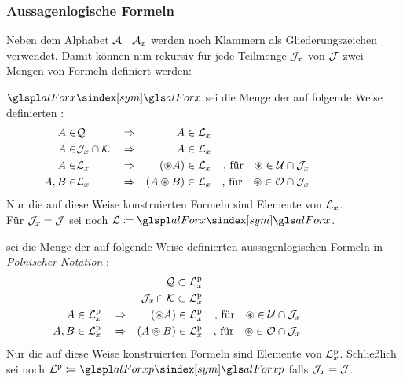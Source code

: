 \subsubsection{Aussagenlogische Formeln}%
\label{subsub:Formeln}

Neben dem Alphabet $\mathcal{A}$ \textbzw\ $\mathcal{A}_x$ werden noch Klammern als Gliederungszeichen verwendet.
Damit können nun rekursiv für jede Teilmenge $\mathcal{J}_x$ von $\mathcal{J}$ zwei Mengen von Formeln definiert werden:

$\glsSym{alForx}$ sei die Menge der auf folgende Weise definierten %
:
\begin{align}
	A    \in & \mathcal{Q}               && \Rightarrow &           A  \in \mathcal{L}_x
	\\
	A    \in & \mathcal{J}_x \cap \mathcal{K}  && \Rightarrow &           A  \in \mathcal{L}_x
	\\
	A    \in & \mathcal{L}_x              && \Rightarrow &   (\circledast A) \in \mathcal{L}_x
	& & \text{, für} \quad \circledast \in \mathcal{U} \cap \mathcal{J}_x
	\\
	A, B \in & \mathcal{L}_x              && \Rightarrow & (A \circledast B) \in \mathcal{L}_x
	& & \text{, für} \quad \circledast \in \mathcal{O} \cap \mathcal{J}_x
	&&&&&&&&&&
\end{align}
Nur die auf diese Weise konstruierten Formeln sind Elemente von $\mathcal{L}_x$.
\\Für $\mathcal{J}_x = \mathcal{J}$ sei noch $\alFor \defeq \glsSym{alForx}$.

 sei die Menge der auf folgende Weise definierten aussagenlogischen Formeln in \emph{Polnischer Notation}%
:
\begin{align}
	&                                  & \mathcal{Q}              \subset \mathcal{L}^\mathrm{p}_x
	\\
	&                                  & \mathcal{J}_x \cap \mathcal{K} \subset \mathcal{L}^\mathrm{p}_x
	\\
	A    \in \mathcal{L}^\mathrm{p}_x & \quad \Rightarrow &  (\circledast A)         \in     \mathcal{L}^\mathrm{p}_x
	& & \text{, für}  \quad \circledast \in \mathcal{U} \cap \mathcal{J}_x
	\\
	A, B \in \mathcal{L}^\mathrm{p}_x & \quad \Rightarrow & (A \circledast B)        \in     \mathcal{L}^\mathrm{p}_x
	& & \text{, für}  \quad \circledast \in \mathcal{O} \cap \mathcal{J}_x
	&&&&&&&&&&
\end{align}
Nur die auf diese Weise konstruierten Formeln sind Elemente von $\mathcal{L}^\mathrm{p}_x$.
Schließlich sei noch $\alForp \defeq \glsSym{alForxp}$ falls $\mathcal{J}_x = \mathcal{J}$.

